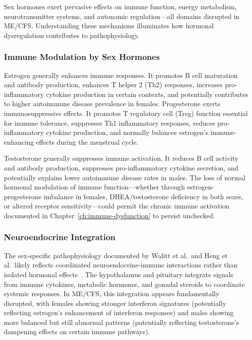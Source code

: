 Sex hormones exert pervasive effects on immune function, energy metabolism, neurotransmitter systems, and autonomic regulation---all domains disrupted in ME/CFS. Understanding these mechanisms illuminates how hormonal dysregulation contributes to pathophysiology.

\subsubsection{Immune Modulation by Sex Hormones}

Estrogen generally enhances immune responses. It promotes B cell maturation and antibody production, enhances T helper 2 (Th2) responses, increases pro-inflammatory cytokine production in certain contexts, and potentially contributes to higher autoimmune disease prevalence in females. Progesterone exerts immunosuppressive effects. It promotes T regulatory cell (Treg) function essential for immune tolerance, suppresses Th1 inflammatory responses, reduces pro-inflammatory cytokine production, and normally balances estrogen's immune-enhancing effects during the menstrual cycle.

Testosterone generally suppresses immune activation. It reduces B cell activity and antibody production, suppresses pro-inflammatory cytokine secretion, and potentially explains lower autoimmune disease rates in males. The loss of normal hormonal modulation of immune function---whether through estrogen-progesterone imbalance in females, DHEA/testosterone deficiency in both sexes, or altered receptor sensitivity---could permit the chronic immune activation documented in Chapter~\ref{ch:immune-dysfunction} to persist unchecked.

\subsubsection{Neuroendocrine Integration}

The sex-specific pathophysiology documented by Walitt et al.\ and Heng et al.\ likely reflects coordinated neuroendocrine-immune interactions rather than isolated hormonal effects~\cite{walitt2024deep,heng2025sexspecific}. The hypothalamus and pituitary integrate signals from immune cytokines, metabolic hormones, and gonadal steroids to coordinate systemic responses. In ME/CFS, this integration appears fundamentally disrupted, with females showing stronger interferon signatures (potentially reflecting estrogen's enhancement of interferon responses) and males showing more balanced but still abnormal patterns (potentially reflecting testosterone's dampening effects on certain immune pathways).

